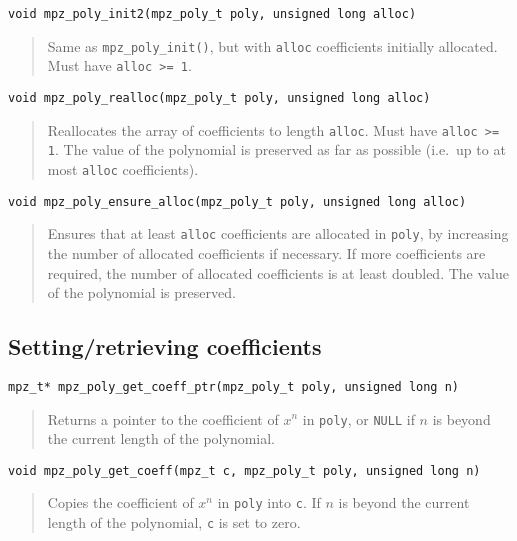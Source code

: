 \documentclass[a4paper,10pt]{article}
\newcommand{\code}{\lstinline}
\begin{document}
\begin{lstlisting}
void mpz_poly_init2(mpz_poly_t poly, unsigned long alloc)
\end{lstlisting}
\begin{quote}
Same as \code{mpz_poly_init()}, but with \code{alloc} coefficients initially allocated. Must have \code{alloc >= 1}.
\end{quote}

\begin{lstlisting}
void mpz_poly_realloc(mpz_poly_t poly, unsigned long alloc)
\end{lstlisting}
\begin{quote}
Reallocates the array of coefficients to length \code{alloc}. Must have \code{alloc >= 1}. The value of the polynomial is preserved as far as possible (i.e.~up to at most \code{alloc} coefficients).
\end{quote}

\begin{lstlisting}
void mpz_poly_ensure_alloc(mpz_poly_t poly, unsigned long alloc)
\end{lstlisting}
\begin{quote}
Ensures that at least \code{alloc} coefficients are allocated in \code{poly}, by increasing the number of allocated coefficients if necessary. If more coefficients are required, the number of allocated coefficients is at least doubled. The value of the polynomial is preserved.
\end{quote}



\subsection{Setting/retrieving coefficients}

\begin{lstlisting}
mpz_t* mpz_poly_get_coeff_ptr(mpz_poly_t poly, unsigned long n)
\end{lstlisting}
\begin{quote}
Returns a pointer to the coefficient of $x^n$ in \code{poly}, or \code{NULL} if $n$ is beyond the current length of the polynomial.
\end{quote}


\begin{lstlisting}
void mpz_poly_get_coeff(mpz_t c, mpz_poly_t poly, unsigned long n)
\end{lstlisting}
\begin{quote}
Copies the coefficient of $x^n$ in \code{poly} into \code{c}. If $n$ is beyond the current length of the polynomial, \code{c} is set to zero.
\end{quote}
\end{document}
